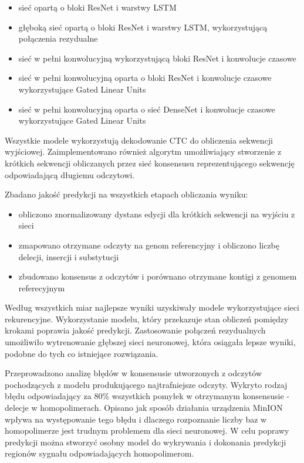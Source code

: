 \documentclass[a4paper,11pt,twoside]{report}
\theoremstyle{definition}
\begin{document}
\begin{itemize}
	\item sieć opartą o bloki ResNet i warstwy LSTM
	\item głęboką sieć opartą o bloki ResNet i warstwy LSTM, wykorzystującą połączenia rezydualne
	\item sieć w pełni konwolucyjną wykorzystującą bloki ResNet i konwolucje czasowe
	\item sieć w pełni konwolucyjną oparta o bloki ResNet i konwolucje czasowe wykorzystujące Gated Linear Units
	\item sieć w pełni konwolucyjną oparta o sieć DenseNet i konwolucje czasowe wykorzystujące Gated Linear Units
\end{itemize}

Wszystkie modele wykorzystują dekodowanie CTC do obliczenia sekwencji wyjściowej. Zaimplementowano również algorytm umożliwiający stworzenie z krótkich sekwencji obliczanych przez sieć konsensusu reprezentującego sekwencję odpowiadającą długiemu odczytowi.

Zbadano jakość predykcji na wszystkich etapach obliczania wyniku:

\begin{itemize}
	\item obliczono znormalizowany dystans edycji dla krótkich sekwencji na wyjściu z sieci
	\item zmapowano otrzymane odczyty na genom referencyjny i obliczono liczbę delecji, insercji i substytucji
	\item zbudowano konsensus z odczytów i porównano otrzymane kontigi z  genomem referecyjnym
\end{itemize}

Według wszystkich miar najlepsze wyniki uzyskiwały modele wykorzystujące sieci rekurencyjne. Wykorzystanie modelu, który przekazuje stan obliczeń pomiędzy krokami poprawia jakość predykcji. Zastosowanie połączeń rezydualnych umożliwiło wytrenowanie głębszej sieci neuronowej, która osiągała lepsze wyniki, podobne do tych co istniejące rozwiązania.

Przeprowadzono analizę błędów w konsensusie utworzonych z odczytów pochodzących z modelu produkującego najtrafniejsze odczyty. Wykryto rodzaj błędu odpowiadający za 80\% wszystkich pomyłek w otrzymanym konsensusie - delecje w homopolimerach. Opisano jak sposób działania urządzenia MinION wpływa na występowanie tego błędu i dlaczego rozpoznanie liczby baz w homopolimerze jest trudnym problemem dla sieci neuronowej. W celu poprawy predykcji można stworzyć osobny model do wykrywania i dokonania predykcji regionów sygnału odpowiadających homopolimerom.
\end{document}
